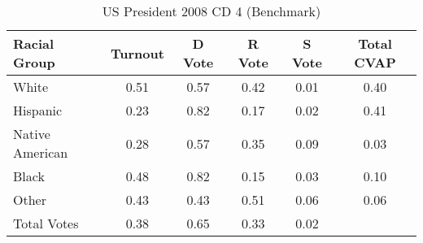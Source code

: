 \begin{table}[htb]
\begin{center}
\caption{US President 2008 CD 4 (Benchmark)}
\label{pres08_cvap_cd_4_benchmark}
\begin{tabular}{lccccc}
  \hline
Racial Group & Turnout & D Vote & R Vote & S Vote & Total CVAP \\ 
  \hline
White & 0.51 & 0.57 & 0.42 & 0.01 & 0.40 \\ 
  Hispanic & 0.23 & 0.82 & 0.17 & 0.02 & 0.41 \\ 
  Native American & 0.28 & 0.57 & 0.35 & 0.09 & 0.03 \\ 
  Black & 0.48 & 0.82 & 0.15 & 0.03 & 0.10 \\ 
  Other & 0.43 & 0.43 & 0.51 & 0.06 & 0.06 \\ 
  Total Votes & 0.38 & 0.65 & 0.33 & 0.02 &  \\ 
   \hline
\end{tabular}
\end{center}
\end{table}
